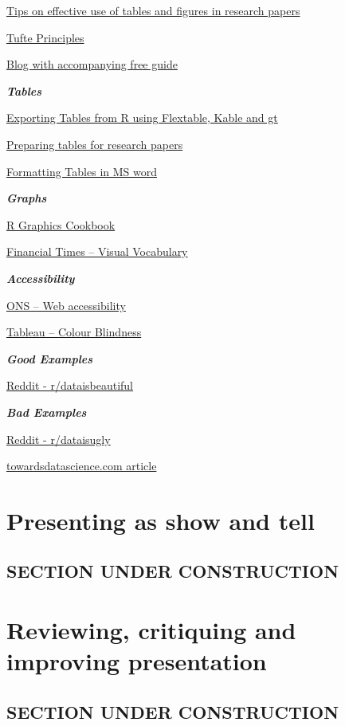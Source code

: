 \documentclass[
]{book}
\begin{document}
\href{https://www.editage.com/insights/tips-on-effective-use-of-tables-and-figures-in-research-papers}{Tips on effective use of tables and figures in research papers}

\href{https://sites.google.com/site/tufteondesign/home/six-fundamental-principles-of-design}{Tufte Principles}

\href{https://blog.hubspot.com/marketing/great-data-visualization-examples}{Blog with accompanying free guide}

\textbf{\emph{Tables}}

\href{https://stats4sd.org/resources/506}{Exporting Tables from R using Flextable, Kable and gt}

\href{https://www.manuscriptedit.com/scholar-hangout/preparing-tables-research-papers/}{Preparing tables for research papers}

\href{http://www.docs.is.ed.ac.uk/skills/documents/3575/3575.pdf}{Formatting Tables in MS word}

\textbf{\emph{Graphs}}

\href{https://r-graphics.org/}{R Graphics Cookbook}

\href{https://github.com/ft-interactive/chart-doctor/blob/master/visual-vocabulary/Visual-vocabulary.pdf}{Financial Times -- Visual Vocabulary}

\textbf{\emph{Accessibility}}

\href{https://style.ons.gov.uk/writing-for-the-web/web-accessibility/introduction-3/}{ONS -- Web accessibility}

\href{https://www.tableau.com/about/blog/2016/4/examining-data-viz-rules-dont-use-red-green-together-53463}{Tableau -- Colour Blindness}

\textbf{\emph{Good Examples}}

\href{https://www.reddit.com/r/dataisbeautiful/}{Reddit - r/dataisbeautiful}

\textbf{\emph{Bad Examples}}

\href{https://www.reddit.com/r/dataisugly/}{Reddit - r/dataisugly}

\href{https://towardsdatascience.com/why-is-this-chart-bad-5f16da298afa}{towardsdatascience.com article}

\hypertarget{show}{%
\chapter{Presenting as show and tell}\label{show}}

\hypertarget{section-under-construction-3}{%
\section{SECTION UNDER CONSTRUCTION}\label{section-under-construction-3}}

\hypertarget{review}{%
\chapter{Reviewing, critiquing and improving presentation}\label{review}}

\hypertarget{section-under-construction-4}{%
\section{SECTION UNDER CONSTRUCTION}\label{section-under-construction-4}}

  
\end{document}
